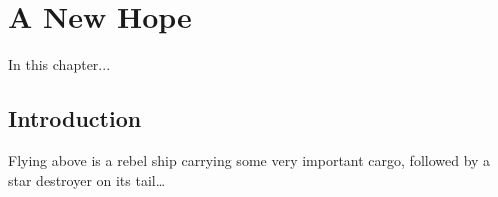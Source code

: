 \chapter{A New Hope}\label{chapter:a-new-hope}


\begin{synopsis}

In this chapter...

\end{synopsis}

\section{Introduction}\label{introduction}

Flying above is a rebel ship carrying some very important cargo,
followed by a star destroyer on its tail\ldots{}

